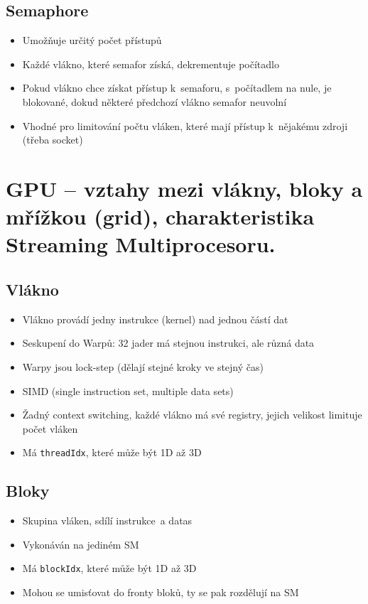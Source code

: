 \subsection{Semaphore}
\begin{itemize}
    \item Umožňuje určitý počet přístupů
    \item Každé vlákno, které semafor získá, dekrementuje počítadlo
    \item Pokud vlákno chce získat přístup k~semaforu, s~počítadlem na nule, je blokované, dokud některé předchozí vlákno semafor neuvolní
    \item Vhodné pro limitování  počtu vláken, které mají přístup k~nějakému zdroji (třeba socket)
\end{itemize}


\section{GPU – vztahy mezi vlákny, bloky a mřížkou (grid), charakteristika Streaming Multiprocesoru.}
\subsection{Vlákno}
\begin{itemize}
    \item Vlákno provádí jedny instrukce (kernel) nad jednou částí dat
    \item Seskupení do Warpů: 32 jader má stejnou instrukci, ale různá data
    \item Warpy jsou lock-step (dělají stejné kroky ve stejný čas)
    \item SIMD (single instruction set, multiple data sets)
    \item Žadný context switching, každé vlákno má své registry, jejich velikost limituje počet vláken
    \item Má \texttt{threadIdx}, které může být 1D až 3D
\end{itemize}

\subsection{Bloky}
\begin{itemize}
    \item Skupina vláken, sdílí instrukce~a datas
    \item Vykonáván na jediném SM
    \item Má \texttt{blockIdx}, které může být 1D až 3D
    \item Mohou se umisťovat do fronty bloků, ty se pak rozdělují na SM
\end{itemize}

